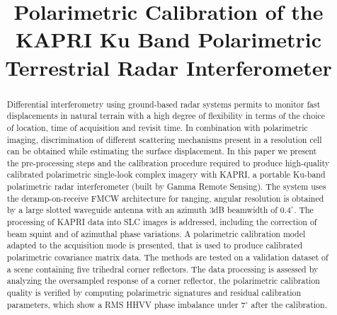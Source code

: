 \documentclass[12pt]{IEEEtran}
\title{Polarimetric Calibration of the KAPRI Ku Band Polarimetric Terrestrial Radar Interferometer}
\author{\IEEEauthorblockN{
	Simone Baffelli,
	Othmar Frey,
	Charles Werner
	Irena Hajnsek
}}
\begin{document}
\maketitle
\begin{abstract}
Differential interferometry using ground-based radar systems permits to monitor fast displacements in natural terrain with a high degree of flexibility in terms of the choice of location, time of acquisition and revisit time. In combination with polarimetric imaging, discrimination of different scattering mechanisms present in a resolution cell can be obtained while estimating the surface displacement.
In this paper we present the pre-processing steps and the calibration procedure required to produce high-quality calibrated polarimetric single-look complex imagery with KAPRI, a portable Ku-band polarimetric radar interferometer (built by Gamma Remote Sensing). The system uses the deramp-on-receive FMCW architecture for ranging, angular resolution is obtained by a large slotted waveguide antenna with an azimuth 3dB beamwidth of $0.4^\circ$. The processing of KAPRI data into SLC images is addressed, including the correction of beam squint and of azimuthal phase variations. A polarimetric calibration model adapted to the acquisition mode is presented, that is used to produce calibrated polarimetric covariance matrix data. The methods are tested on a validation dataset of a scene containing five trihedral corner reflectors. The data processing is assessed by analyzing the oversampled response of a corner reflector, the polarimetric calibration quality is verified by computing polarimetric signatures and residual calibration parameters, which show a RMS HHVV phase imbalance under $7^\circ$ after the calibration.
\end{abstract}






\end{document}
